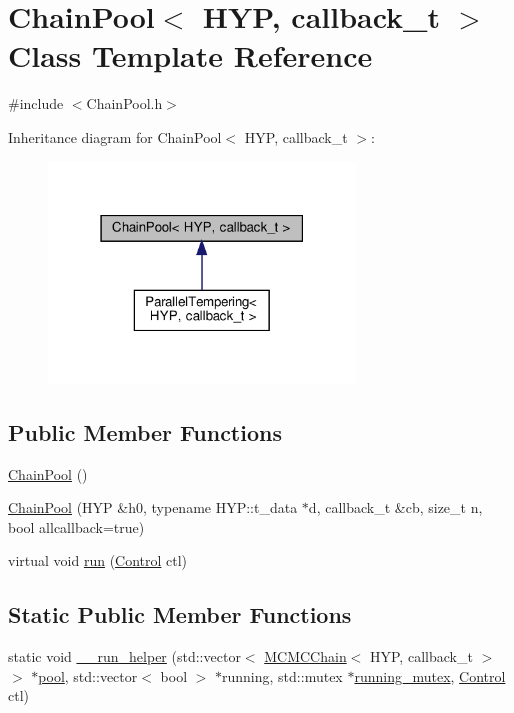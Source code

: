 \hypertarget{class_chain_pool}{}\section{Chain\+Pool$<$ H\+YP, callback\+\_\+t $>$ Class Template Reference}
\label{class_chain_pool}


{\ttfamily \#include $<$Chain\+Pool.\+h$>$}



Inheritance diagram for Chain\+Pool$<$ H\+YP, callback\+\_\+t $>$\+:\nopagebreak
\begin{figure}[H]
\begin{center}
\leavevmode
\includegraphics[width=231pt]{class_chain_pool__inherit__graph}
\end{center}
\end{figure}
\subsection*{Public Member Functions}
\begin{DoxyCompactItemize}
\item 
\hyperlink{class_chain_pool_ae8795a9a7c0fff45c82334fa821c8c3c}{Chain\+Pool} ()
\item 
\hyperlink{class_chain_pool_ae6d9483840ee517354d429324fbcc800}{Chain\+Pool} (H\+YP \&h0, typename H\+Y\+P\+::t\+\_\+data $\ast$d, callback\+\_\+t \&cb, size\+\_\+t n, bool allcallback=true)
\item 
virtual void \hyperlink{class_chain_pool_af5f0e391f9794ff89f29296c8b41bf8e}{run} (\hyperlink{struct_control}{Control} ctl)
\end{DoxyCompactItemize}
\subsection*{Static Public Member Functions}
\begin{DoxyCompactItemize}
\item 
static void \hyperlink{class_chain_pool_a7df513bcd7b99c2fa99a9cfdd238817b}{\+\_\+\+\_\+run\+\_\+helper} (std\+::vector$<$ \hyperlink{class_m_c_m_c_chain}{M\+C\+M\+C\+Chain}$<$ H\+YP, callback\+\_\+t $>$$>$ $\ast$\hyperlink{class_chain_pool_af89400f6e9a2312fe2ee7873745a6e91}{pool}, std\+::vector$<$ bool $>$ $\ast$running, std\+::mutex $\ast$\hyperlink{class_chain_pool_a6efe006156a22132b452d50dab9f76c0}{running\+\_\+mutex}, \hyperlink{struct_control}{Control} ctl)
\end{DoxyCompactItemize}
